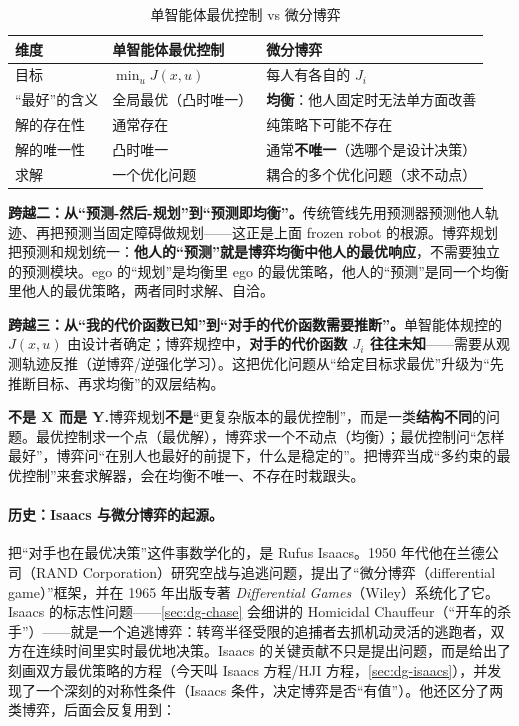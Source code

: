 \begin{table}[H]\centering\small
\caption{单智能体最优控制 vs 微分博弈}
\label{tab:dg-vs}
\begin{tabular}{p{} p{} p{}}
\toprule
维度 & 单智能体最优控制 & 微分博弈 \\
\midrule
目标 & $\min_u J(x,u)$ & 每人有各自的 $J_i$ \\
“最好”的含义 & 全局最优（凸时唯一） & \textbf{均衡}：他人固定时无法单方面改善 \\
解的存在性 & 通常存在 & 纯策略下可能不存在 \\
解的唯一性 & 凸时唯一 & 通常\textbf{不唯一}（选哪个是设计决策） \\
求解 & 一个优化问题 & 耦合的多个优化问题（求不动点） \\
\bottomrule
\end{tabular}
\end{table}

\textbf{跨越二：从“预测-然后-规划”到“预测即均衡”。}\;传统管线先用预测器预测他人轨迹、再把预测当固定障碍做规划——这正是上面 frozen robot 的根源。博弈规划把预测和规划统一：\textbf{他人的“预测”就是博弈均衡中他人的最优响应}，不需要独立的预测模块。ego 的“规划”是均衡里 ego 的最优策略，他人的“预测”是同一个均衡里他人的最优策略，两者同时求解、自洽。

\textbf{跨越三：从“我的代价函数已知”到“对手的代价函数需要推断”。}\;单智能体规控的 $J(x,u)$ 由设计者确定；博弈规控中，\textbf{对手的代价函数 $J_i$ 往往未知}——需要从观测轨迹反推（逆博弈/逆强化学习）。这把优化问题从“给定目标求最优”升级为“先推断目标、再求均衡”的双层结构。

\begin{note}
\textbf{不是 X 而是 Y.}\;博弈规划\textbf{不是}“更复杂版本的最优控制”，而是一类\textbf{结构不同}的问题。最优控制求一个点（最优解），博弈求一个不动点（均衡）；最优控制问“怎样最好”，博弈问“在别人也最好的前提下，什么是稳定的”。把博弈当成“多约束的最优控制”来套求解器，会在均衡不唯一、不存在时栽跟头。
\end{note}

\paragraph{历史：Isaacs 与微分博弈的起源。}
把“对手也在最优决策”这件事数学化的，是 Rufus Isaacs。1950 年代他在兰德公司（RAND Corporation）研究空战与追逃问题，提出了“微分博弈（differential game）”框架，并在 1965 年出版专著 \emph{Differential Games}（Wiley）系统化了它\cite{isaacs1965differential}。Isaacs 的标志性问题——\cref{sec:dg-chase} 会细讲的 Homicidal Chauffeur（“开车的杀手”）——就是一个追逃博弈：转弯半径受限的追捕者去抓机动灵活的逃跑者，双方在连续时间里实时最优地决策。Isaacs 的关键贡献不只是提出问题，而是给出了刻画双方最优策略的方程（今天叫 Isaacs 方程/HJI 方程，\cref{sec:dg-isaacs}），并发现了一个深刻的对称性条件（Isaacs 条件，决定博弈是否“有值”）。他还区分了两类博弈，后面会反复用到：

